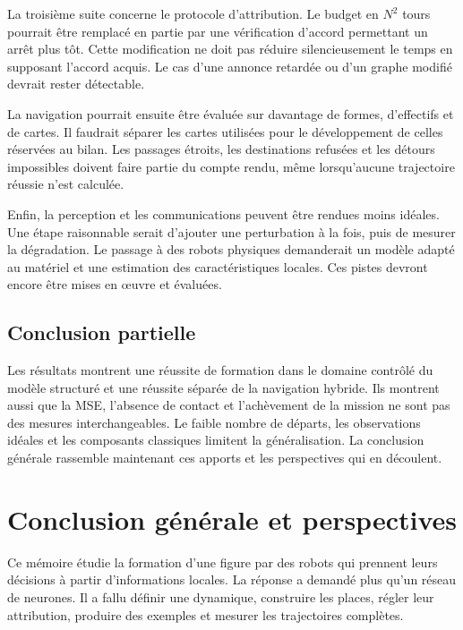 La troisième suite concerne le protocole d'attribution. Le budget en $N^2$ tours pourrait être remplacé en partie par une vérification d'accord permettant un arrêt plus tôt. Cette modification ne doit pas réduire silencieusement le temps en supposant l'accord acquis. Le cas d'une annonce retardée ou d'un graphe modifié devrait rester détectable.

La navigation pourrait ensuite être évaluée sur davantage de formes, d'effectifs et de cartes. Il faudrait séparer les cartes utilisées pour le développement de celles réservées au bilan. Les passages étroits, les destinations refusées et les détours impossibles doivent faire partie du compte rendu, même lorsqu'aucune trajectoire réussie n'est calculée.

Enfin, la perception et les communications peuvent être rendues moins idéales. Une étape raisonnable serait d'ajouter une perturbation à la fois, puis de mesurer la dégradation. Le passage à des robots physiques demanderait un modèle adapté au matériel et une estimation des caractéristiques locales. Ces pistes devront encore être mises en œuvre et évaluées.

\section*{Conclusion partielle}
{}
Les résultats montrent une réussite de formation dans le domaine contrôlé du modèle structuré et une réussite séparée de la navigation hybride. Ils montrent aussi que la MSE, l'absence de contact et l'achèvement de la mission ne sont pas des mesures interchangeables. Le faible nombre de départs, les observations idéales et les composants classiques limitent la généralisation. La conclusion générale rassemble maintenant ces apports et les perspectives qui en découlent.

\setcounter{figure}{0}
\renewcommand{\thefigure}{C.\arabic{figure}}
\renewcommand{\theHfigure}{conclusion.\arabic{figure}}
\setcounter{table}{0}
\renewcommand{\thetable}{C.\arabic{table}}
\renewcommand{\theHtable}{conclusion.\arabic{table}}
\chapter*{Conclusion générale et perspectives}
{}

Ce mémoire étudie la formation d'une figure par des robots qui prennent leurs décisions à partir d'informations locales. La réponse a demandé plus qu'un réseau de neurones. Il a fallu définir une dynamique, construire les places, régler leur attribution, produire des exemples et mesurer les trajectoires complètes.


